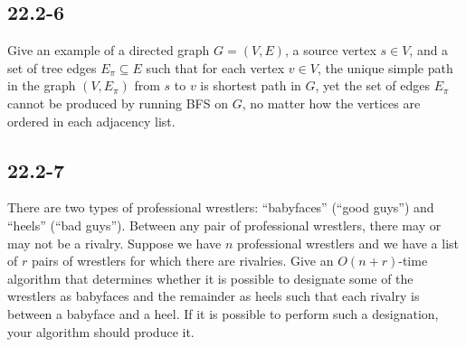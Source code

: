 \documentclass{../../class}
\begin{document}
\subsection*{22.2-6}
Give an example of a directed graph $G = (V, E)$, a source vertex $s\in V$, and a set of tree edges $E_\pi \subseteq E$ such that for each vertex $v\in V$, the unique simple path in the graph $(V, E_\pi)$ from $s$ to $v$ is shortest path in $G$, yet the set of edges $E_\pi$ cannot be produced by running BFS on $G$, no matter how the vertices are ordered in each adjacency list.

\subsection*{22.2-7}
There are two types of professional wrestlers: \enquote{babyfaces} (\enquote{good guys}) and \enquote{heels} (\enquote{bad guys}). Between any pair of professional wrestlers, there may or may not be a rivalry. Suppose we have $n$ professional wrestlers and we have a list of $r$ pairs of wrestlers for which there are rivalries. Give an $O(n+r)$-time algorithm that determines whether it is possible to designate some of the wrestlers as babyfaces and the remainder as heels such that each rivalry is between a babyface and a heel. If it is possible to perform such a designation, your algorithm should produce it.
\end{document}
